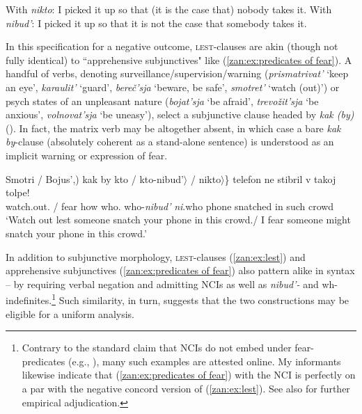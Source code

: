 \documentclass[output=paper,colorlinks,citecolor=brown]{langscibook}
\begin{document}
\ea \label{zan:ex:paraphrases}
\ea With \textit{nikto}: I picked it up so that (it is the case that) nobody takes it.
\ex \label{zan:ex:paraphrases 2} With \textit{nibud'}: I picked it up so that it is not the case that somebody takes it.
\z \z

\noindent In this specification for a negative outcome, \textsc{lest}-clauses are akin (though not fully identical) to ``apprehensive subjunctives" like (\ref{zan:ex:predicates of fear}). A handful of verbs, denoting surveillance/supervision/warning (\textit{prismatrivat'} `keep an eye', \textit{karaulit'} `guard', \textit{bereč'sja} `beware, be safe', \textit{smotret'} `watch (out)') or psych states of an unpleasant nature (\textit{bojat'sja} `be afraid', \textit{trevožit'sja} `be anxious', \textit{volnovat'sja} `be uneasy'), select a subjunctive clause headed by \textit{kak (by)} (\citealt{nilsson2012peculiarities}). In fact, the matrix verb may be altogether absent, in which case a bare \textit{kak by}-clause (absolutely coherent as a stand-alone sentence) is understood as an implicit warning or expression of fear. 


\ea \label{zan:ex:predicates of fear}
  \gll \minsp{(} Smotri / Bojus',) kak by \minsp{\{} kto / \minsp{$\langle$}  kto-nibud'$\rangle$ / \minsp{$\langle$}  nikto$\rangle$\} telefon ne stibril v takoj tolpe! \\
      {} watch.out.{\IMP} / fear how {\SBJV} {} who.{\INDF} {} {} {} who-\textit{nibud'} {} {} {} \textit{ni}.who phone {\NEG} snatched in such crowd\\
         \glt `Watch out lest someone snatch your phone in this crowd./ I fear someone might snatch your phone in this crowd.'      
\z

\noindent In addition to  subjunctive morphology, \textsc{lest}-clauses (\ref{zan:ex:lest}) and apprehensive subjunctives (\ref{zan:ex:predicates of fear}) also pattern alike in syntax -- by requiring verbal negation and admitting NCIs as well as \textit{nibud'-} and wh-indefinites.\footnote{Contrary to the standard claim that NCIs do not embed under fear-predicates (e.g., \citealt{zan:abels2005, zan:brown1995}), many such examples are attested online. My informants likewise indicate that (\ref{zan:ex:predicates of fear}) with the NCI is perfectly on a par with the negative concord version of (\ref{zan:ex:lest}). See also \citet{nilsson2012peculiarities} for further empirical adjudication.} Such similarity, in turn, suggests that the two constructions may be eligible for a uniform analysis.
\end{document}
